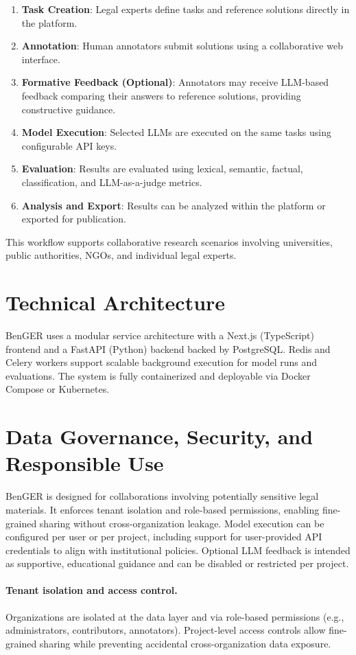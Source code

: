 \documentclass[sigconf]{acmart}
\begin{document}
\begin{enumerate}
  \item \textbf{Task Creation}: Legal experts define tasks and reference solutions directly in the platform.
  \item \textbf{Annotation}: Human annotators submit solutions using a collaborative web interface.
  \item \textbf{Formative Feedback (Optional)}: Annotators may receive LLM-based feedback comparing their answers to reference solutions, providing constructive guidance.
  \item \textbf{Model Execution}: Selected LLMs are executed on the same tasks using configurable API keys.
  \item \textbf{Evaluation}: Results are evaluated using lexical, semantic, factual, classification, and LLM-as-a-judge metrics.
  \item \textbf{Analysis and Export}: Results can be analyzed within the platform or exported for publication.
\end{enumerate}

This workflow supports collaborative research scenarios involving universities, public authorities, NGOs, and individual legal experts.

\section{Technical Architecture}
BenGER uses a modular service architecture with a Next.js (TypeScript) frontend and a FastAPI (Python) backend backed by PostgreSQL. 
Redis and Celery workers support scalable background execution for model runs and evaluations. The system is fully containerized and deployable via Docker Compose or Kubernetes.

\section{Data Governance, Security, and Responsible Use}
BenGER is designed for collaborations involving potentially sensitive legal materials. It enforces tenant isolation and role-based permissions, enabling fine-grained sharing without cross-organization leakage. Model execution can be configured per user or per project, including support for user-provided API credentials to align with institutional policies. Optional LLM feedback is intended as supportive, educational guidance and can be disabled or restricted per project.

\paragraph{Tenant isolation and access control.}
Organizations are isolated at the data layer and via role-based permissions (e.g., administrators, contributors, annotators). Project-level access controls allow fine-grained sharing while preventing accidental cross-organization data exposure.
\end{document}
